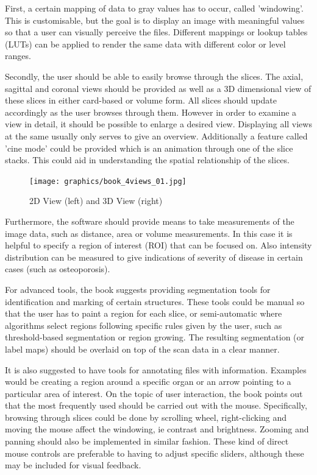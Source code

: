\documentclass[a4paper,11pt,titlepage]{article}
\begin{document}
First, a certain mapping of data to gray values has to occur, called 'windowing'. This is customisable, but the goal is to display an image with meaningful values so that a user can visually perceive the files. Different mappings or lookup tables (LUTs) can be applied to render the same data with different color or level ranges.

Secondly, the user should be able to easily browse through the slices. The axial, sagittal and coronal views should be provided as well as a 3D dimensional view of these slices in either card-based or volume form. All slices should update accordingly as the user browses through them. However in order to examine a view in detail, it should be possible to enlarge a desired view. Displaying all views at the same usually only serves to give an overview. Additionally a feature called 'cine mode' could be provided which is an animation through one of the slice stacks. This could aid in understanding the spatial relationship of the slices.

\begin{figure}[ht!]
\centering
\texttt{[image: graphics/book\_4views\_01.jpg]}
\caption{2D View (left) and 3D View (right)}
\label{fig:UIdesign1}
\end{figure}

Furthermore, the software should provide means to take measurements of the image data, such as distance, area or volume measurements. In this case it is helpful to specify a region of interest (ROI) that can be focused on. Also intensity distribution can be measured to give indications of severity of disease in certain cases (such as osteoporosis)\cite{book}.

 For advanced tools, the book suggests providing segmentation tools for identification and marking of certain structures. These tools could be manual so that the user has to paint a region for each slice, or semi-automatic where algorithms select regions following specific rules given by the user, such as threshold-based segmentation or region growing. The resulting segmentation (or label maps) should be overlaid on top of the scan data in a clear manner.
 
 It is also suggested to have tools for annotating files with information. Examples would be creating a region around a specific organ or an arrow pointing to a particular area of interest.
 On the topic of user interaction, the book points out that the most frequently used should be carried out with the mouse. Specifically, browsing through slices could be done by scrolling wheel, right-clicking and moving the mouse affect the windowing, ie contrast and brightness. Zooming and panning should also be implemented in similar fashion. These kind of direct mouse controls are preferable to having to adjust specific sliders, although these may be included for visual feedback.
 
\end{document}

